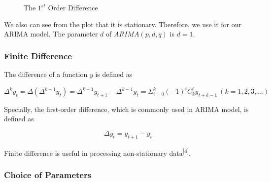 \documentclass[12pt,a4paper]{article}
\newcommand{\Predictor}{ARIMA }
\begin{document}
\begin{spacing}{1.2}
\begin{figure}
	\begin{center}
		\caption{The $1^{st}$ Order Difference}
		\label{fig:diff}
	\end{center}
\end{figure}

We also can see from the plot that it is stationary. Therefore, we use it for our ARIMA model. The parameter $d$ of $ARIMA(p,d,q)$ is $d=1$.

\subsubsection{Finite Difference}

The difference of a function $y$ is defined as

$$
\Delta^k y_t = \Delta(\Delta^{k-1}y_t)=\Delta^{k-1}y_{t+1}-\Delta^{k-1}y_t=\Sigma_{i=0}^k(-1)^i C_k^iy_{t+k-1} \ (k=1,2,3,\dots)
$$

Specially, the first-order difference, which is commonly used in \Predictor model, is defined as

$$
\Delta y_t = y_{t+1} - y_{t}
$$

Finite difference is useful in processing non-stationary data\textsuperscript{[4]}.

\subsubsection{Choice of Parameters}


\end{spacing}
\end{document}

